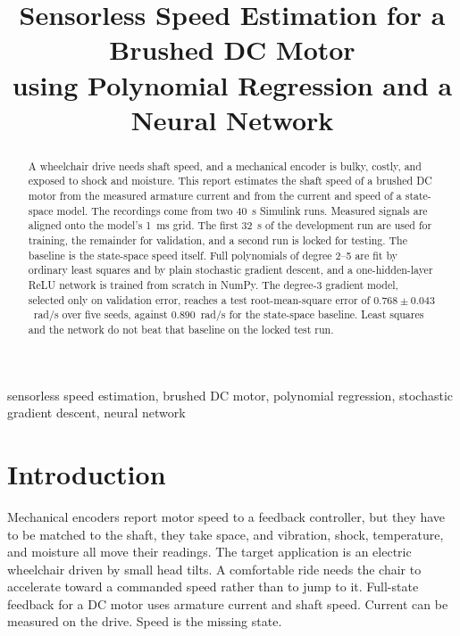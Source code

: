 \documentclass[conference]{IEEEtran}
\begin{document}
\title{Sensorless Speed Estimation for a Brushed DC Motor\\
using Polynomial Regression and a Neural Network}

\author{
\and
{}
}

\maketitle

\begin{abstract}
A wheelchair drive needs shaft speed, and a mechanical encoder is bulky, costly, and exposed to shock and moisture. This report estimates the shaft speed of a brushed DC motor from the measured armature current and from the current and speed of a state-space model. The recordings come from two 40~s Simulink runs. Measured signals are aligned onto the model's 1~ms grid. The first 32~s of the development run are used for training, the remainder for validation, and a second run is locked for testing. The baseline is the state-space speed itself. Full polynomials of degree 2--5 are fit by ordinary least squares and by plain stochastic gradient descent, and a one-hidden-layer ReLU network is trained from scratch in NumPy. The degree-3 gradient model, selected only on validation error, reaches a test root-mean-square error of $0.768 \pm 0.043$~rad/s over five seeds, against $0.890$~rad/s for the state-space baseline. Least squares and the network do not beat that baseline on the locked test run.
\end{abstract}

\begin{IEEEkeywords}
sensorless speed estimation, brushed DC motor, polynomial regression, stochastic gradient descent, neural network
\end{IEEEkeywords}

\section{Introduction}
Mechanical encoders report motor speed to a feedback controller, but they have to be matched to the shaft, they take space, and vibration, shock, temperature, and moisture all move their readings. The target application is an electric wheelchair driven by small head tilts. A comfortable ride needs the chair to accelerate toward a commanded speed rather than to jump to it. Full-state feedback for a DC motor uses armature current and shaft speed. Current can be measured on the drive. Speed is the missing state.
\end{document}

